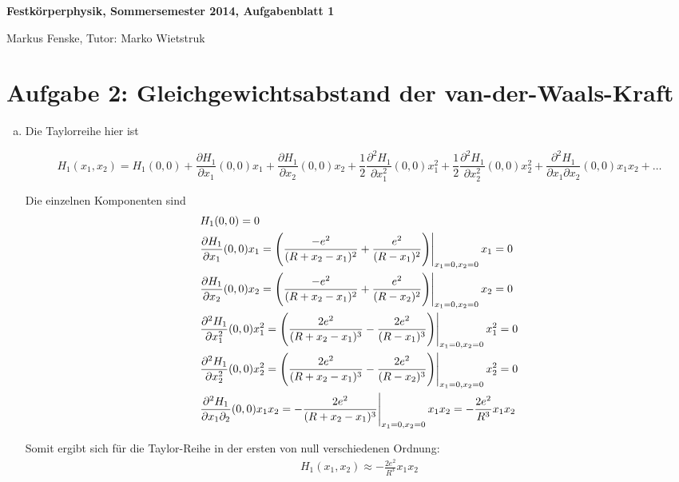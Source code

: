 \documentclass[a4paper,german,12pt,smallheadings]{scrartcl}
\begin{document}
\allowdisplaybreaks %
\begin{center}
\bfseries %
\sffamily %
\vspace{-40pt}
Festkörperphysik, Sommersemester 2014, Aufgabenblatt 1

Markus Fenske, Tutor: Marko Wietstruk
\vspace{-10pt}
\end{center}
\section*{Aufgabe 2: Gleichgewichtsabstand der van-der-Waals-Kraft}

\begin{enumerate}[a)]
  \item
    Die Taylorreihe hier ist

    \begin{equation}
      H_1(x_1, x_2) = H_1(0,0)
        +             \frac{\partial H_1}{\partial x_1}                (0,0) x_1
        +             \frac{\partial H_1}{\partial x_2}                (0,0) x_2
        + \frac{1}{2} \frac{\partial^2 H_1}{\partial x_1^2}            (0,0) x_1^2
        + \frac{1}{2} \frac{\partial^2 H_1}{\partial x_2^2}            (0,0) x_2^2
        + \frac{\partial^2 H_1}{\partial x_1 \partial x_2} (0,0) x_1x_2
        + \dots
    \end{equation}

    Die einzelnen Komponenten sind
    \begin{align}
      &H_1(0,0) = 0 \\
      &\frac{\partial H_1}{\partial x_1}(0,0) x_1
        = \eval{\del{\frac{-e^2}{(R+x_2-x_1)^2} + \frac{e^2}{(R-x_1)^2}}}_{x_1=0, x_2=0} x_1 = 0 \\
      &\frac{\partial H_1}{\partial x_2}(0,0) x_2
        = \eval{\del{\frac{-e^2}{(R+x_2-x_1)^2} + \frac{e^2}{(R-x_2)^2}}}_{x_1=0, x_2=0} x_2 = 0 \\
      &\frac{\partial^2 H_1}{\partial x_1^2}(0,0) x_1^2
        = \eval{\del{\frac{2e^2}{(R+x_2-x_1)^3} - \frac{2e^2}{(R-x_1)^3}}}_{x_1=0, x_2=0} x_1^2 = 0 \\
      &\frac{\partial^2 H_1}{\partial x_2^2}(0,0) x_2^2
        = \eval{\del{\frac{2e^2}{(R+x_2-x_1)^3} - \frac{2e^2}{(R-x_2)^3}}}_{x_1=0, x_2=0} x_2^2 = 0 \\
      &\frac{\partial^2 H_1}{\partial x_1 \partial_2}(0,0) x_1x_2
        = \eval{-\frac{2e^2}{(R+x_2-x_1)^3}}_{x_1=0, x_2=0} x_1x_2 = -\frac{2e^2}{R^3} x_1 x_2 \\
    \end{align}

    Somit ergibt sich für die Taylor-Reihe in der ersten von null verschiedenen Ordnung:
    \begin{align}
      H_1(x_1, x_2) \approx  -\frac{2e^2}{R^3} x_1 x_2
    \end{align}
\end{enumerate}
\end{document}
